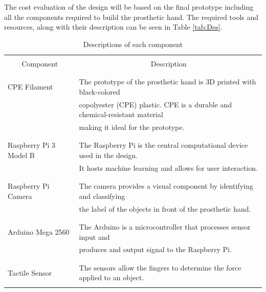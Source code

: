 \documentclass[11.5pt]{article}
\begin{document}
The cost evaluation of the design will be based on the final prototype including all the components required to build the prosthetic hand. The required tools and resources, along with their description can be seen in Table \ref{tab:Des}.


\begin{table}[H]
    \centering
    \caption{Descriptions of each component}
    \vspace{3mm}
    \begin{tabular}{|l|l|}
    \hline
      & \\
    \multicolumn{1}{|c|}{Component}  & \multicolumn{1}{c|}{Description} \\ 
     & \\ \hline
     
      & \\
        CPE Filament &  The prototype of the prosthetic hand is 3D printed with black-colored \\  & copolyester (CPE) plastic. CPE is a durable and chemical-resistant material \\ & making it ideal for the prototype.  \\
        & \\ \hline 
        
         & \\
        Raspberry Pi 3 Model B & The Raspberry Pi is the central computational device used in the design. \\ & It hosts machine learning and allows for user interaction.\\ 
        & \\ \hline
        
         & \\
        Raspberry Pi Camera & The camera provides a visual component by identifying and classifying \\ & the label of the objects in front of the prosthetic hand.\\ 
        & \\ \hline
        
         & \\
        Arduino Mega 2560 & The Arduino is a microcontroller that processes sensor input and \\ & produces and output signal to the Raspberry Pi.\\ 
        & \\ \hline
        
         & \\
        Tactile Sensor & The sensors allow the fingers to determine the force applied to an object.\\ 
        & \\ \hline
        

\end{tabular}
\end{table}
\end{document}
